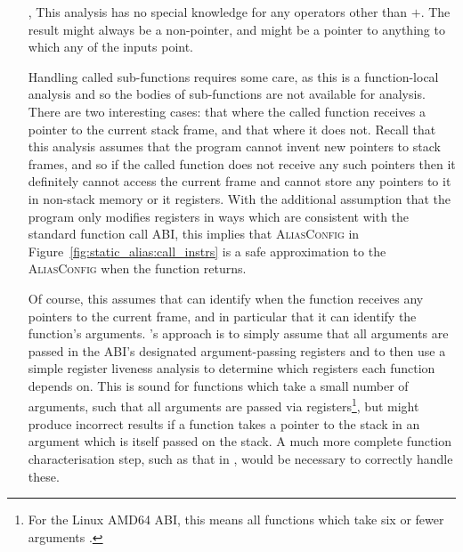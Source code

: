 \begin{itemize}
\item[\circled{5},\circled{6}] This analysis has no special knowledge
  for any operators other than $+$.  The result might always be a
  non-pointer, and might be a pointer to anything to which any of the
  inputs point.

\item[\circled{7}] Handling called sub-functions requires some care,
  as this is a function-local analysis and so the bodies of
  sub-functions are not available for analysis.  There are two
  interesting cases: that where the called function receives a pointer
  to the current stack frame, and that where it does not.  Recall that
  this analysis assumes that the program cannot invent new pointers to
  stack frames, and so if the called function does not receive any
  such pointers then it definitely cannot access the current frame and
  cannot store any pointers to it in non-stack memory or it registers.
  With the additional assumption that the program only modifies
  registers in ways which are consistent with the standard function
  call ABI, this implies that \textsc{AliasConfig} in
  Figure~\ref{fig:static_alias:call_instrs} is a safe approximation to
  the \textsc{AliasConfig} when the function returns.

  Of course, this assumes that {\implementation} can identify when the
  function receives any pointers to the current frame, and in
  particular that it can identify the function's arguments.
  {\Implementation}'s approach is to simply assume that all arguments
  are passed in the ABI's designated argument-passing registers and to
  then use a simple register liveness analysis to determine which
  registers each function depends on.  This is sound for functions
  which take a small number of arguments, such that all arguments are
  passed via registers\footnote{For the Linux AMD64 ABI, this means
    all functions which take six or fewer arguments .}, but might produce incorrect results if a
  function takes a pointer to the stack in an argument which is itself
  passed on the stack.  A much more complete function characterisation
  step, such as that in ,
  would be necessary to correctly handle these.
  
\end{itemize}


